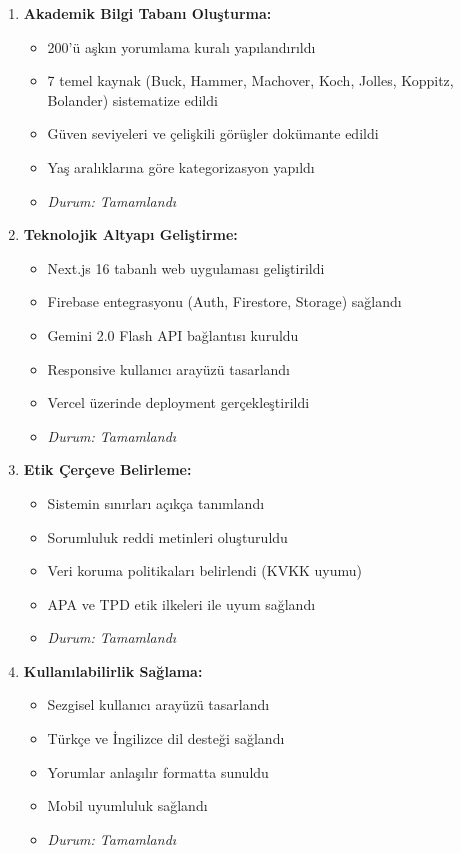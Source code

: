 \begin{enumerate}
  \item \textbf{Akademik Bilgi Tabanı Oluşturma:}
  \begin{itemize}
    \item 200'ü aşkın yorumlama kuralı yapılandırıldı
    \item 7 temel kaynak (Buck, Hammer, Machover, Koch, Jolles, Koppitz, Bolander) sistematize edildi
    \item Güven seviyeleri ve çelişkili görüşler dokümante edildi
    \item Yaş aralıklarına göre kategorizasyon yapıldı
    \item \textit{Durum: Tamamlandı}
  \end{itemize}

  \item \textbf{Teknolojik Altyapı Geliştirme:}
  \begin{itemize}
    \item Next.js 16 tabanlı web uygulaması geliştirildi
    \item Firebase entegrasyonu (Auth, Firestore, Storage) sağlandı
    \item Gemini 2.0 Flash API bağlantısı kuruldu
    \item Responsive kullanıcı arayüzü tasarlandı
    \item Vercel üzerinde deployment gerçekleştirildi
    \item \textit{Durum: Tamamlandı}
  \end{itemize}

  \item \textbf{Etik Çerçeve Belirleme:}
  \begin{itemize}
    \item Sistemin sınırları açıkça tanımlandı
    \item Sorumluluk reddi metinleri oluşturuldu
    \item Veri koruma politikaları belirlendi (KVKK uyumu)
    \item APA ve TPD etik ilkeleri ile uyum sağlandı
    \item \textit{Durum: Tamamlandı}
  \end{itemize}

  \item \textbf{Kullanılabilirlik Sağlama:}
  \begin{itemize}
    \item Sezgisel kullanıcı arayüzü tasarlandı
    \item Türkçe ve İngilizce dil desteği sağlandı
    \item Yorumlar anlaşılır formatta sunuldu
    \item Mobil uyumluluk sağlandı
    \item \textit{Durum: Tamamlandı}
  \end{itemize}


\end{enumerate}
